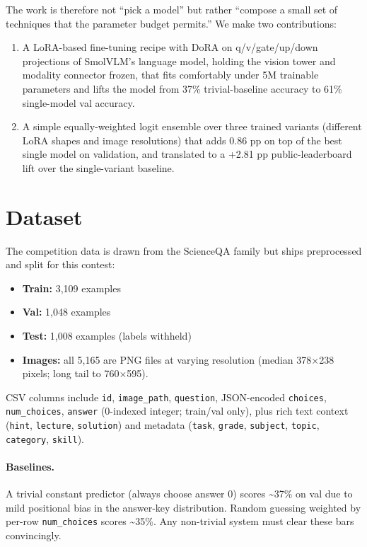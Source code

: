 \documentclass[11pt]{article}
\begin{document}
The work is therefore not ``pick a model'' but rather ``compose a small set of techniques that the parameter budget permits.'' We make two contributions:

\begin{enumerate}
    \item A LoRA-based fine-tuning recipe with DoRA on q/v/gate/up/down projections of SmolVLM's language model, holding the vision tower and modality connector frozen, that fits comfortably under 5M trainable parameters and lifts the model from 37\% trivial-baseline accuracy to 61\% single-model val accuracy.
    \item A simple equally-weighted logit ensemble over three trained variants (different LoRA shapes and image resolutions) that adds 0.86 pp on top of the best single model on validation, and translated to a +2.81 pp public-leaderboard lift over the single-variant baseline.
\end{enumerate}

\section{Dataset}

The competition data is drawn from the ScienceQA family \citep{lu2022scienceqa} but ships preprocessed and split for this contest:

\begin{itemize}
    \item \textbf{Train:} 3,109 examples
    \item \textbf{Val:} 1,048 examples
    \item \textbf{Test:} 1,008 examples (labels withheld)
    \item \textbf{Images:} all 5,165 are PNG files at varying resolution (median 378$\times$238 pixels; long tail to 760$\times$595).
\end{itemize}

CSV columns include \texttt{id}, \texttt{image\_path}, \texttt{question}, JSON-encoded \texttt{choices}, \texttt{num\_choices}, \texttt{answer} (0-indexed integer; train/val only), plus rich text context (\texttt{hint}, \texttt{lecture}, \texttt{solution}) and metadata (\texttt{task}, \texttt{grade}, \texttt{subject}, \texttt{topic}, \texttt{category}, \texttt{skill}).

\paragraph{Baselines.} A trivial constant predictor (always choose answer 0) scores \textasciitilde 37\% on val due to mild positional bias in the answer-key distribution. Random guessing weighted by per-row \texttt{num\_choices} scores \textasciitilde 35\%. Any non-trivial system must clear these bars convincingly.
\end{document}
